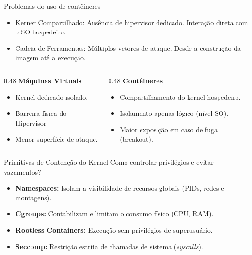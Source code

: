 \documentclass[aspectratio=169]{beamer}
\begin{document}
\begin{frame}{Problemas do uso de contêineres}
    \begin{itemize}
        \item Kerner Compartilhado: Ausência de hipervisor dedicado. Interação direta com o SO hospedeiro.
        \item Cadeia de Ferramentas: Múltiplos vetores de ataque. Desde a construção da imagem até a execução.
    \end{itemize}

    \begin{columns}[T]
        \begin{column}{0.48\textwidth}
            \textbf{Máquinas Virtuais}
            \begin{itemize}
                \item Kernel dedicado isolado.
                \item Barreira física do Hipervisor.
                \item Menor superfície de ataque.
            \end{itemize}
        \end{column}
        \begin{column}{0.48\textwidth}
            \textbf{Contêineres}
            \begin{itemize}
                \item Compartilhamento do kernel hospedeiro.
                \item Isolamento apenas lógico (nível SO).
                \item Maior exposição em caso de fuga (breakout).
            \end{itemize}
        \end{column}
    \end{columns}
\end{frame}

\begin{frame}{Primitivas de Contenção do Kernel}
    Como controlar privilégios e evitar vazamentos?
    \vspace{0.5cm}
    \begin{itemize}
        \item \textbf{Namespaces:} Isolam a visibilidade de recursos globais (PIDs, redes e montagens).
        \item \textbf{Cgroups:} Contabilizam e limitam o consumo físico (CPU, RAM).
        \item \textbf{Rootless Containers:} Execução sem privilégios de superusuário.
        \item \textbf{Seccomp:} Restrição estrita de chamadas de sistema (\textit{syscalls}).
    \end{itemize}
\end{frame}
\end{document}

